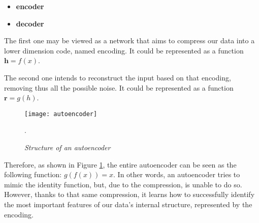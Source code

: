 \begin{itemize}
    \item \textbf{encoder}
    \item \textbf{decoder}
\end{itemize}

The first one may be viewed as a network that aims to compress
our data into a  lower dimension code, named encoding.
It could be represented as a function \(\boldsymbol{h}=f(x)\).\cite{deepLearningBook}

The second one intends to reconstruct the input based on that encoding,
removing thus all the possible noise.
It could be represented as a function \(\boldsymbol{r}=g(h)\).\cite{deepLearningBook}

\begin{figure}[h]
    \centering
    \texttt{[image: autoencoder]}
    \caption{\emph{Structure of an autoencoder \cite{deepLearningBook}}}.
    \label{fig:autoencoder}
\end{figure}

Therefore, as shown in Figure \ref{fig:autoencoder},
the entire autoencoder can be seen as the following function: \(g(f(x))=x\).
In other words, an autoencoder tries to mimic the identity function,
but, due to the compression, is unable to do so.
However, thanks to that same compression,
it learns how to successfully identify
the most important features of our data's internal structure,
represented by the encoding.

